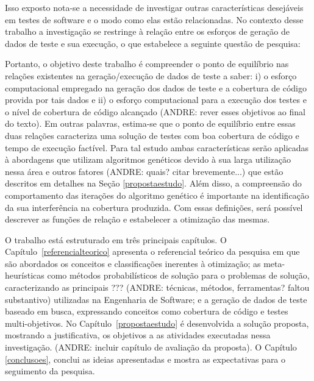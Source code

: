 Isso exposto nota-se a necessidade de investigar outras características desejáveis em testes de software e o modo como elas estão relacionadas. No contexto desse trabalho a investigação se restringe à relação entre os esforços de geração de dados de teste e sua execução, o que estabelece a seguinte questão de pesquisa:

 
\vspace{1.0cm}
\vspace{1.0cm}


Portanto, o objetivo deste trabalho é compreender o ponto de equilíbrio nas relações existentes na geração/execução de dados de teste a saber: i) o esforço computacional empregado na geração dos dados de teste e a cobertura de código provida por tais dados e ii) o esforço computacional para a execução dos testes e o nível de cobertura de código alcançado (ANDRE: rever esses objetivos ao final do texto). Em outras palavras, estima-se que o ponto de equilíbrio entre essas duas relações caracteriza  uma solução de testes com boa cobertura de código e tempo de execução factível. Para tal estudo ambas características serão aplicadas à abordagens que utilizam algoritmos genéticos devido à sua larga utilização nessa área e outros fatores (ANDRE: quais? citar brevemente...) que estão descritos em detalhes na Seção \ref{propostaestudo}. Além disso, a compreensão do comportamento das iterações do algoritmo genético é importante na identificação da sua interferência na cobertura produzida. Com essas definições, será possível descrever as funções de relação e estabelecer a otimização das mesmas. 


O trabalho está estruturado em três principais capítulos. O Capítulo~\ref{referencialteorico} apresenta o referencial teórico da pesquisa em que são abordados os conceitos e classificações inerentes à otimização; as meta-heurísticas como métodos probabilísticos de solução para o problemas de solução, caracterizando as principais ??? (ANDRE: técnicas, métodos, ferramentas? faltou substantivo) utilizadas na Engenharia de Software; e a geração de dados de teste baseado em busca, expressando conceitos como cobertura de código e testes multi-objetivos. No Capítulo~\ref{propostaestudo} é desenvolvida a solução proposta, mostrando a justificativa, os objetivos a as atividades executadas nessa investigação. (ANDRE: incluir capítulo de avaliação da proposta). O Capítulo \ref{conclusoes}, conclui as ideias apresentadas e mostra as expectativas para o seguimento da pesquisa.
